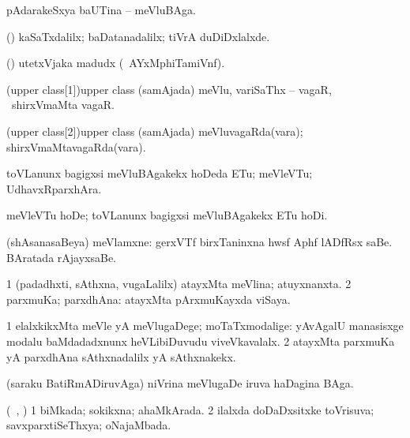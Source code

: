 \bentry
{} 
\gl{\nA}
\expl{}
\bmng
pAdarakeSxya baUTina -- meVluBAga. 
\emng

\noindent
\gl{\pagu}
\expl{}
\bmng
{} (\AmA) kaSaTxdalilx; baDatanadalilx; tiVrA duDiDxlalxde. 
\emng
\eentry

\bentry
{} 
\gl{\nA}
\expl{}
\bmng
(\ashi) utetxVjaka madudx (\kanmu\ AYxMphiTamiVnf). 
\emng
\eentry

\bentry
\word(upper class[1]){upper class} 
\pron{}
\gl{\nA}
\expl{}
\bmng
(samAjada) meVlu, variSaThx -- vagaR, \kanmu\ shirxVmaMta vagaR. 
\emng
\eentry

\bentry
\word(upper class[2]){upper class} 
\pron{}
\gl{\gu}
\expl{}
\bmng
(samAjada) meVluvagaRda(vara); shirxVmaMtavagaRda(vara). 
\emng
\eentry

\bentry
{} 
\gl{\nA}
\expl{}
\bmng
toVLanunx bagigxsi meVluBAgakekx hoDeda ETu; meVleVTu; UdhavxRparxhAra. 
\emng
\eentry

\bentry
{} 
\gl{\sakirx}
\expl{}
\bmng
meVleVTu hoDe; toVLanunx bagigxsi meVluBAgakekx ETu hoDi. 
\emng
\eentry

\bentry
{}
\gl{\nA}
\expl{}
\bmng
(shAsanasaBeya) meVlamxne: 
\banum
{} gerxVTf birxTaninxna hwsf Aphf lADfRsx saBe. 
 BAratada rAjayxsaBe. 
\eanum
\emng
\eentry

\bentry
{} 
\gl{\gu}
\bmng
\bnum
\num{1} (padadhxti, sAthxna, \mo vugaLalilx) atayxMta meVlina; atuyxnanxta. 
\num{2} parxmuKa; parxdhAna:  atayxMta pArxmuKayxda viSaya. 
\enum
\emng
\eentry

\bentry
{} 
\gl{\kirxvi}
\expl{}
\bmng
\bnum
\num{1} elalxkikxMta meVle yA meVlugaDege; moTaTxmodalige:  yAvAgalU manasisxge modalu baMdadadxnunx heVLibiDuvudu viveVkavalalx. 
\num{2} atayxMta parxmuKa yA parxdhAna sAthxnadalilx yA sAthxnakekx. 
\enum
\emng
\eentry

\bentry
{}
\gl{\nA}
\expl{}
\bmng
(saraku BatiRmADiruvAga) niVrina meVlugaDe iruva haDagina BAga. 
\emng
\eentry

\bentry
{} 
\gl{\gu}
\expl{}
\bmng
(\kanmu\ \birx, \AmA) 
\bnum
\num{1} biMkada; sokikxna; ahaMkArada. 
\num{2} ilalxda doDaDxsitxke toVrisuva; savxparxtiSeThxya; oNajaMbada. 
\enum
\emng
\eentry

